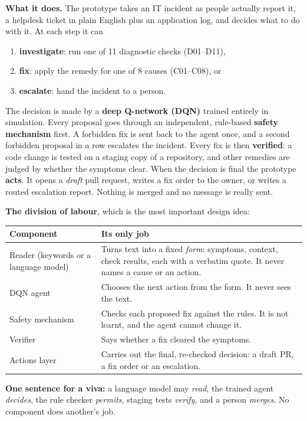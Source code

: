 \documentclass[11pt,a4paper]{article}
\newenvironment{keypoint}{\par\smallskip\noindent\begin{lrbox}{\kpbox}\begin{minipage}{0.95\linewidth}}{\end{minipage}\end{lrbox}\fcolorbox{lineblue}{note}{\usebox{\kpbox}}\par\smallskip}
\begin{document}
\textbf{What it does.} The prototype takes an IT incident as people actually report it, a
helpdesk ticket in plain English plus an application log, and decides what to do with it. At
each step it can
\begin{enumerate}
  \item \textbf{investigate}: run one of 11 diagnostic checks (D01--D11),
  \item \textbf{fix}: apply the remedy for one of 8 causes (C01--C08), or
  \item \textbf{escalate}: hand the incident to a person.
\end{enumerate}
The decision is made by a \textbf{deep Q-network (DQN)} trained entirely in simulation. Every
proposal goes through an independent, rule-based \textbf{safety mechanism} first. A forbidden fix
is sent back to the agent once, and a second forbidden proposal in a row escalates the incident.
Every fix is then \textbf{verified}: a code change is tested on a staging copy of a repository,
and other remedies are judged by whether the symptoms clear. When the decision is final the
prototype \textbf{acts}. It opens a \emph{draft} pull request, writes a fix order to the owner,
or writes a routed escalation report. Nothing is merged and no message is really sent.

\textbf{The division of labour}, which is the most important design idea:
\begin{center}
\begin{tabularx}{\linewidth}{lL}
\toprule
Component & Its only job \\
\midrule
Reader (keywords or a language model) & Turns text into a fixed \emph{form}: symptoms, context, check results, each with a verbatim quote. It never names a cause or an action. \\
DQN agent & Chooses the next action from the form. It never sees the text. \\
Safety mechanism & Checks each proposed fix against the rules. It is not learnt, and the agent cannot change it. \\
Verifier & Says whether a fix cleared the symptoms. \\
Actions layer & Carries out the final, re-checked decision: a draft PR, a fix order or an escalation. \\
\bottomrule
\end{tabularx}
\end{center}

\begin{keypoint}
\textbf{One sentence for a viva:} a language model may \emph{read}, the trained agent
\emph{decides}, the rule checker \emph{permits}, staging tests \emph{verify}, and a person
\emph{merges}. No component does another's job.
\end{keypoint}
\end{document}
